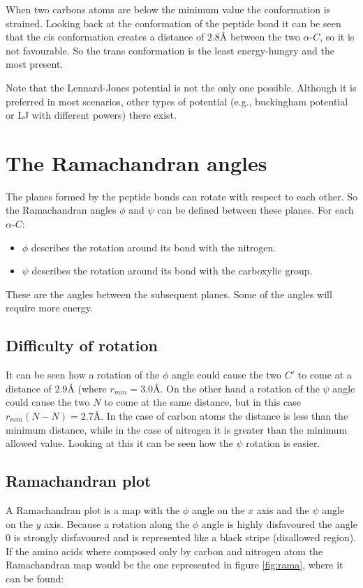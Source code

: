 	When two carbons atoms are below the minimum value the conformation is strained.
	Looking back at the conformation of the peptide bond it can be seen that the cis conformation creates a distance of $2.8\si{\angstrom}$ between the two $\alpha$-$C$, so it is not favourable.
	So the trans conformation is the least energy-hungry and the most present.

	Note that the Lennard-Jones potential is not the only one possible.
	Although it is preferred in most scenarios, other types of potential (e.g., buckingham potential or LJ with different powers) there exist.

\section{The Ramachandran angles}
The planes formed by the peptide bonds can rotate with respect to each other.
So the Ramachandran angles $\phi$ and $\psi$ can be defined between these planes.
For each $\alpha$-$C$:

\begin{multicols}{2}
	\begin{itemize}
		\item $\phi$ describes the rotation around its bond with the nitrogen.
		\item $\psi$ describes the rotation around its bond with the carboxylic group.
	\end{itemize}
\end{multicols}

These are the angles between the subsequent planes.
Some of the angles will require more energy.

	\subsection{Difficulty of rotation}
	It can be seen how a rotation of the $\phi$ angle could cause the two $C'$ to come at a distance of $2.9\si{\angstrom}$ (where $r_{min} = 3.0\si{\angstrom}$.
	On the other hand a rotation of the $\psi$ angle could cause the two $N$ to come at the same distance, but in this case $r_{min}(N-N) = 2.7\si{\angstrom}$.
	In the case of carbon atoms the distance is less than the minimum distance, while in the case of nitrogen it is greater than the minimum allowed value.
	Looking at this it can be seen how the $\psi$ rotation is easier.

	\subsection{Ramachandran plot}
	A Ramachandran plot is a map with the $\phi$ angle on the $x$ axis and the $\psi$ angle on the $y$ axis.
	Because a rotation along the $\phi$ angle is highly disfavoured the angle $0$ is strongly disfavoured and is represented like a black stripe (disallowed region).
	If the amino acids where composed only by carbon and nitrogen atom the Ramachandran map would be the one represented in figure \ref{fig:rama}, where it can be found:

